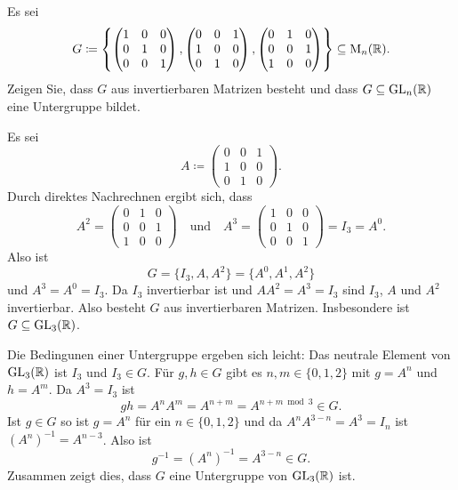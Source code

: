 \begin{question}
 Es sei
 \[
  G \coloneqq
  \left\{
  \begin{pmatrix}
   1 & 0 & 0 \\
   0 & 1 & 0 \\
   0 & 0 & 1
  \end{pmatrix},
  \begin{pmatrix}
   0 & 0 & 1 \\
   1 & 0 & 0 \\
   0 & 1 & 0
  \end{pmatrix},
  \begin{pmatrix}
   0 & 1 & 0 \\
   0 & 0 & 1 \\
   1 & 0 & 0
  \end{pmatrix}
  \right\}
  \subseteq \operatorname{M}_n(\mathbb{R}).
 \]
 Zeigen Sie, dass $G$ aus invertierbaren Matrizen besteht und dass $G \subseteq \operatorname{GL}_n(\mathbb{R})$ eine Untergruppe bildet.
\end{question}
\begin{solution}
 Es sei
 \[
  A \coloneqq
  \begin{pmatrix}
   0 & 0 & 1 \\
   1 & 0 & 0 \\
   0 & 1 & 0
  \end{pmatrix}.
 \]
 Durch direktes Nachrechnen ergibt sich, dass
 \[
  A^2 =
  \begin{pmatrix}
   0 & 1 & 0 \\
   0 & 0 & 1 \\
   1 & 0 & 0
  \end{pmatrix}
  \quad \text{und} \quad
  A^3 =
  \begin{pmatrix}
   1 & 0 & 0 \\
   0 & 1 & 0 \\
   0 & 0 & 1
  \end{pmatrix}
  = I_3 = A^0.
 \]
 Also ist
 \[
  G = \{I_3, A, A^2\} = \{A^0, A^1, A^2\}
 \]
 und $A^3 = A^0 = I_3$. Da $I_3$ invertierbar ist und $A A^2 = A^3 = I_3$ sind $I_3$, $A$ und $A^2$ invertierbar. Also besteht $G$ aus invertierbaren Matrizen. Insbesondere ist $G \subseteq \operatorname{GL}_3(\mathbb{R})$.
 
 Die Bedingunen einer Untergruppe ergeben sich leicht: Das neutrale Element von $\operatorname{GL}_3(\mathbb{R})$ ist $I_3$ und $I_3 \in G$. Für $g,h \in G$ gibt es $n, m \in \{0, 1, 2\}$ mit $g = A^n$ und $h = A^m$. Da $A^3 = I_3$ ist
 \[
  gh = A^n A^m = A^{n+m} = A^{n+m \bmod 3} \in G.
 \]
 Ist $g \in G$ so ist $g = A^n$ für ein $n \in \{0,1,2\}$ und da $A^n A^{3-n} = A^3 = I_n$ ist $(A^n)^{-1} = A^{n-3}$. Also ist
 \[
  g^{-1} = (A^n)^{-1} = A^{3-n} \in G.
 \]
 Zusammen zeigt dies, dass $G$ eine Untergruppe von $\operatorname{GL}_3(\mathbb{R})$ ist.
\end{solution}



